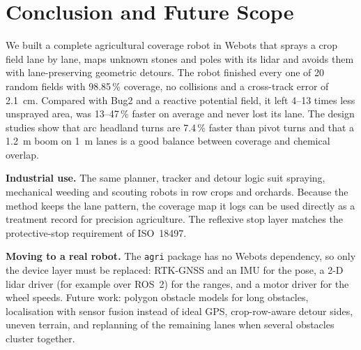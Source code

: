 \documentclass[12pt,a4paper]{article}
\begin{document}
\section{Conclusion and Future Scope}
We built a complete agricultural coverage robot in Webots that sprays a crop field lane by lane, maps unknown stones and poles with its lidar and avoids them with lane-preserving geometric detours. The robot finished every one of 20 random fields with 98.85\,\% coverage, no collisions and a cross-track error of 2.1~cm. Compared with Bug2 and a reactive potential field, it left 4--13 times less unsprayed area, was 13--47\,\% faster on average and never lost its lane. The design studies show that arc headland turns are 7.4\,\% faster than pivot turns and that a 1.2~m boom on 1~m lanes is a good balance between coverage and chemical overlap.

\textbf{Industrial use.} The same planner, tracker and detour logic suit spraying, mechanical weeding and scouting robots in row crops and orchards. Because the method keeps the lane pattern, the coverage map it logs can be used directly as a treatment record for precision agriculture. The reflexive stop layer matches the protective-stop requirement of ISO~18497.

\textbf{Moving to a real robot.} The \texttt{agri} package has no Webots dependency, so only the device layer must be replaced: RTK-GNSS and an IMU for the pose, a 2-D lidar driver (for example over ROS~2) for the ranges, and a motor driver for the wheel speeds. Future work: polygon obstacle models for long obstacles, localisation with sensor fusion instead of ideal GPS, crop-row-aware detour sides, uneven terrain, and replanning of the remaining lanes when several obstacles cluster together.
\end{document}

